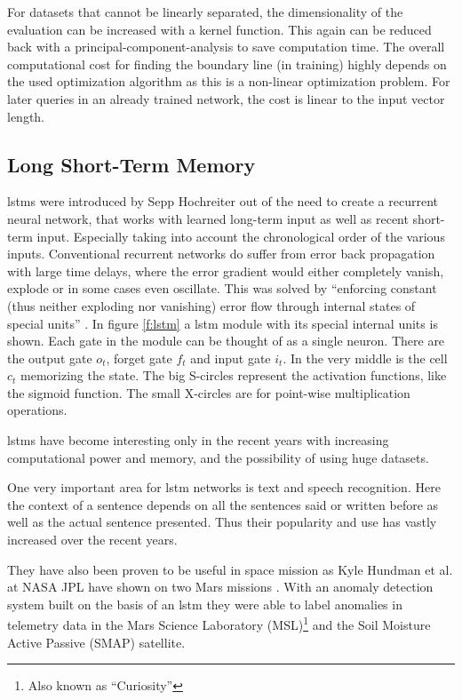 	For datasets that cannot be linearly separated, the dimensionality of the evaluation can be increased with a kernel function. This again can be reduced back with a principal-component-analysis to save computation time. The overall computational cost for finding the boundary line (in training) highly depends on the used optimization algorithm as this is a non-linear optimization problem. For later queries in an already trained network, the cost is linear to the input vector length.
	
	\subsection{Long Short-Term Memory}
	\acfp{lstm} were introduced by Sepp Hochreiter \cite{lstm} out of the need to create a recurrent neural network, that works with learned long-term input as well as recent short-term input. Especially taking into account the chronological order of the various inputs. \newline
	Conventional recurrent networks do suffer from error back propagation with large time delays, where the error gradient would either completely vanish, explode or in some cases even oscillate. This was solved by \enquote{enforcing constant (thus neither exploding nor vanishing) error flow through internal states of special units} \cite[p. 1f]{lstm}. \newline
	In figure \ref{f:lstm} a \ac{lstm} module with its special internal units is shown. Each gate in the module can be thought of as a single neuron. There are the output gate $o_t$, forget gate $f_t$ and input gate $i_t$. In the very middle is the cell $c_t$ memorizing the state. The big S-circles represent the activation functions, like the sigmoid function. The small X-circles are for point-wise multiplication operations.
		
	\acp{lstm} have become interesting only in the recent years with increasing computational power and memory, and the possibility of using huge datasets.
	
	One very important area for \ac{lstm} networks is text and speech recognition. Here the context of a sentence depends on all the sentences said or written before as well as the actual sentence presented. Thus their popularity and use has vastly increased over the recent years.
	
	They have also been proven to be useful in space mission as Kyle Hundman et al. at NASA JPL have shown on two Mars missions \cite{sc-lstm-detection}. With an anomaly detection system built on the basis of an \ac{lstm} they were able to label anomalies in telemetry data in the Mars Science Laboratory (MSL)\footnote{Also known as \enquote{Curiosity}} and the Soil Moisture Active Passive (SMAP) satellite.	
	
